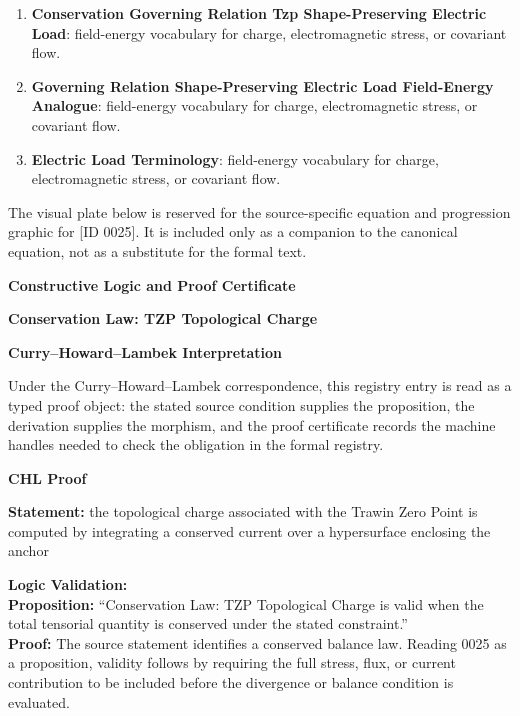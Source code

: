 \begingroup\footnotesize\sloppy
\begin{enumerate}[leftmargin=1.35em,itemsep=1pt,topsep=1pt,parsep=0pt]
\item \textbf{Conservation Governing Relation Tzp Shape-Preserving Electric Load}: field-energy vocabulary for charge, electromagnetic stress, or covariant flow.
\item \textbf{Governing Relation Shape-Preserving Electric Load Field-Energy Analogue}: field-energy vocabulary for charge, electromagnetic stress, or covariant flow.
\item \textbf{Electric Load Terminology}: field-energy vocabulary for charge, electromagnetic stress, or covariant flow.
\end{enumerate}
\endgroup

\begingroup\footnotesize\sloppy
The visual plate below is reserved for the source-specific equation and progression graphic for [ID 0025]. It is included only as a companion to the canonical equation, not as a substitute for the formal text.
\par\endgroup
\ifTZPDarkEdition
{}
\fi

\clearpage
\begingroup\tzpsupportsetup
\noindent\textbf{\fontsize{10.8pt}{12.8pt}\selectfont [ID 0025] Constructive Logic and Proof Certificate}\par
\noindent\textbf{\fontsize{10pt}{12pt}\selectfont Conservation Law: TZP Topological Charge}\par
\vspace{0.45em}
\begingroup
\footnotesize
\setlength{\parskip}{0.22em}
\setlength{\parindent}{0pt}
\noindent\textbf{Curry--Howard--Lambek Interpretation}\par
Under the Curry--Howard--Lambek correspondence, this registry entry is read as a typed proof
object: the stated source condition supplies the proposition, the derivation supplies the
morphism, and the proof certificate records the machine handles needed to check the obligation
in the formal registry.

\vspace{0.45em}
\noindent\textbf{CHL Proof}\par
\textbf{Statement:} the topological charge associated with the Trawin Zero Point is computed by integrating
a conserved current over a hypersurface enclosing the anchor

\textbf{Logic Validation:}\\
\textbf{Proposition:} ``Conservation Law: TZP Topological Charge is valid when the total tensorial quantity is
conserved under the stated constraint.''\\
\textbf{Proof:} The source statement identifies a conserved balance law. Reading 0025 as a proposition,
validity follows by requiring the full stress, flux, or current contribution to be
included before the divergence or balance condition is evaluated.

